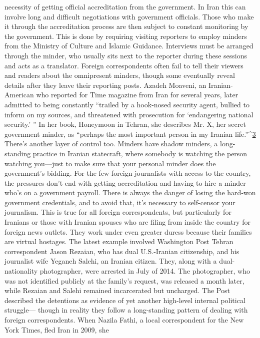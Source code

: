 necessity of getting official accreditation from the government. In Iran this can involve
long and difficult negotiations with government officials. Those who make it through the
accreditation process are then subject to constant monitoring by the government. This is
done by requiring visiting reporters to employ minders from the Ministry of Culture and
Islamic Guidance. Interviews must be arranged through the minder, who usually sits next
to the reporter during these sessions and acts as a translator.
Foreign correspondents often fail to tell their viewers and readers about the omnipresent
minders, though some eventually reveal details after they leave their reporting posts.
Azadeh Moaveni, an Iranian-American who reported for Time magazine from Iran for
several years, later admitted to being constantly ``trailed by a hook-nosed security agent,
bullied to inform on my sources, and threatened with prosecution for ‘endangering
national security.’ '' In her book, Honeymoon in Tehran, she describes Mr. X, her secret
government minder, as ``perhaps the most important person in my Iranian life.''^{\href{#endnotes}{3}}
There’s another layer of control too. Minders have shadow minders, a long-standing
practice in Iranian statecraft, where somebody is watching the person watching you—just
to make sure that your personal minder does the government’s bidding.
For the few foreign journalists with access to the country, the pressures don’t end with
getting accreditation and having to hire a minder who’s on a government payroll. There is
always the danger of losing the hard-won government credentials, and to avoid that, it’s
necessary to self-censor your journalism. This is true for all foreign correspondents, but
particularly for Iranians or those with Iranian spouses who are filing from inside the
country for foreign news outlets. They work under even greater duress because their
families are virtual hostages.
The latest example involved Washington Post Tehran correspondent Jason Rezaian, who
has dual U.S.-Iranian citizenship, and his journalist wife Yeganeh Salehi, an Iranian
citizen. They, along with a dual-nationality photographer, were arrested in July of 2014.
The photographer, who was not identified publicly at the family’s request, was released a
month later, while Rezaian and Salehi remained incarcerated but uncharged. The Post
described the detentions as evidence of yet another high-level internal political struggle—
though in reality they follow a long-standing pattern of dealing with foreign
correspondents.
When Nazila Fathi, a local correspondent for the New York Times, fled Iran in 2009, she
